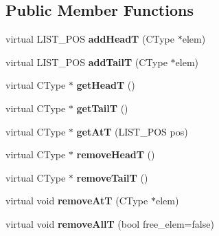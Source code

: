 \subsection*{Public Member Functions}
\begin{DoxyCompactItemize}
\item 
\hypertarget{class_c_list_t_a1135a93b349ac4ae024e45b8fbdc2842}{virtual L\-I\-S\-T\-\_\-\-P\-O\-S {\bfseries add\-Head\-T} (C\-Type $\ast$elem)}\label{class_c_list_t_a1135a93b349ac4ae024e45b8fbdc2842}

\item 
\hypertarget{class_c_list_t_a580d6fa5153806358134cda4fdd7810e}{virtual L\-I\-S\-T\-\_\-\-P\-O\-S {\bfseries add\-Tail\-T} (C\-Type $\ast$elem)}\label{class_c_list_t_a580d6fa5153806358134cda4fdd7810e}

\item 
\hypertarget{class_c_list_t_a4645ce0c83fb57db7b7c7b5baeff73ec}{virtual C\-Type $\ast$ {\bfseries get\-Head\-T} ()}\label{class_c_list_t_a4645ce0c83fb57db7b7c7b5baeff73ec}

\item 
\hypertarget{class_c_list_t_a3084c493b524681a3bc40be808bc5b93}{virtual C\-Type $\ast$ {\bfseries get\-Tail\-T} ()}\label{class_c_list_t_a3084c493b524681a3bc40be808bc5b93}

\item 
\hypertarget{class_c_list_t_a18acff60ba234e5f4e6728be0c66a171}{virtual C\-Type $\ast$ {\bfseries get\-At\-T} (L\-I\-S\-T\-\_\-\-P\-O\-S pos)}\label{class_c_list_t_a18acff60ba234e5f4e6728be0c66a171}

\item 
\hypertarget{class_c_list_t_a8d5f6f7d4251425a6583f4ffe6ccdd37}{virtual C\-Type $\ast$ {\bfseries remove\-Head\-T} ()}\label{class_c_list_t_a8d5f6f7d4251425a6583f4ffe6ccdd37}

\item 
\hypertarget{class_c_list_t_acb8c0cc7df7297b766065d3d89eba530}{virtual C\-Type $\ast$ {\bfseries remove\-Tail\-T} ()}\label{class_c_list_t_acb8c0cc7df7297b766065d3d89eba530}

\item 
\hypertarget{class_c_list_t_abf84e4b6b4cb035ea2a5c174acf8da45}{virtual void {\bfseries remove\-At\-T} (C\-Type $\ast$elem)}\label{class_c_list_t_abf84e4b6b4cb035ea2a5c174acf8da45}

\item 
\hypertarget{class_c_list_t_a33519401fb498e0b5f64e2da041726cc}{virtual void {\bfseries remove\-All\-T} (bool free\-\_\-elem=false)}\label{class_c_list_t_a33519401fb498e0b5f64e2da041726cc}


\end{DoxyCompactItemize}
